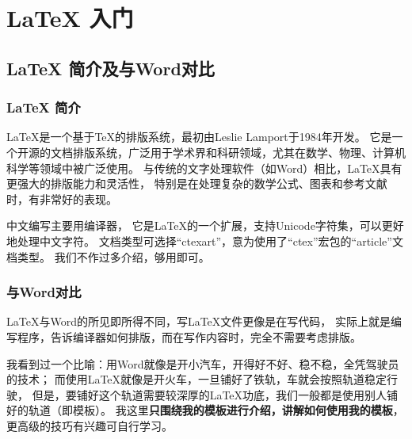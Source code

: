 \newpage
\section{\texorpdfstring{\LaTeX{} 入门}{LaTeX入门}} 
\subsection{\texorpdfstring{\LaTeX{} 简介及与Word对比}{Latex简介及与Word对比}}

\subsubsection{\texorpdfstring{\LaTeX{} 简介}{LaTeX简介}}

\LaTeX{}是一个基于\TeX{}的排版系统，最初由Leslie Lamport于1984年开发。
它是一个开源的文档排版系统，广泛用于学术界和科研领域，尤其在数学、物理、计算机科学等领域中被广泛使用。
与传统的文字处理软件（如Word）相比，\LaTeX{}具有更强大的排版能力和灵活性，
特别是在处理复杂的数学公式、图表和参考文献时，有非常好的表现。

中文编写主要用\XeLaTeX{}编译器，
它是\LaTeX{}的一个扩展，支持Unicode字符集，可以更好地处理中文字符。
文档类型可选择“ctexart”，意为使用了“ctex”宏包的“article”文档类型。
我们不作过多介绍，够用即可。

\subsubsection{与Word对比}

\LaTeX{}与Word的所见即所得不同，写\LaTeX{}文件更像是在写代码，
实际上就是编写程序，告诉编译器如何排版，而在写作内容时，完全不需要考虑排版。

我看到过一个比喻：用Word就像是开小汽车，开得好不好、稳不稳，全凭驾驶员的技术；
而使用\LaTeX{}就像是开火车，一旦铺好了铁轨，车就会按照轨道稳定行驶，
但是，要铺好这个轨道需要较深厚的\LaTeX{}功底，我们一般都是使用别人铺好的轨道（即模板）。
我这里\textbf{只围绕我的模板进行介绍，讲解如何使用我的模板}，更高级的技巧有兴趣可自行学习。


